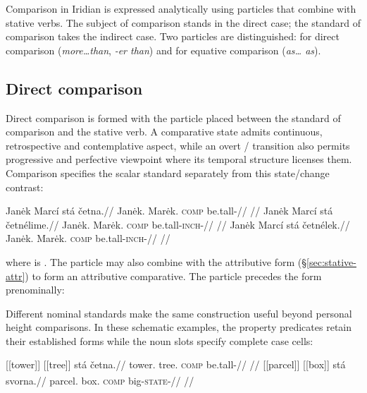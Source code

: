 Comparison in Iridian is expressed analytically using particles that combine
with stative verbs. The subject of comparison stands in the direct case; the
standard of comparison takes the indirect case. Two particles are
distinguished:  for direct comparison (\textit{more\ldots than},
\textit{-er than}) and  for equative comparison (\textit{as\ldots
as}).

\subsection{Direct comparison}

Direct comparison is formed with the particle  placed between the
standard of comparison and the stative verb. A comparative state admits
continuous, retrospective and contemplative aspect, while an overt
/ transition also permits progressive and perfective
viewpoint where its temporal structure licenses them. Comparison specifies
the scalar standard separately from this state/change contrast:

\pex
\a
\begingl
\gla Janėk Marcí stá četna.//
\glb Janėk.\Dir{} Marėk.\Ind{} \textsc{comp} be.tall-\Cont{}//
\glft {}//
\endgl
\a
\begingl
\gla Janėk Marcí stá četnélime.//
\glb Janėk.\Dir{} Marėk.\Ind{} \textsc{comp} be.tall-\textsc{inch}-\Prog{}//
\glft {}//
\endgl
\a
\begingl
\gla Janėk Marcí stá četnélek.//
\glb Janėk.\Dir{} Marėk.\Ind{} \textsc{comp} be.tall-\textsc{inch}-\Pf{}//
\glft {}//
\endgl
\xe

\noindent where  is . The particle  may also
combine with the  attributive form (§\ref{sec:stative-attr}) to form
an attributive comparative. The particle precedes the  form
prenominally:

\pex
\a {} 
\a {} 
\xe

Different nominal standards make the same construction useful beyond
personal height comparisons. In these schematic examples, the property
predicates retain their established forms while the noun slots specify
complete case cells:

\pex\label{ex:comparison-slot-dimensions}
\a
\begingl
\gla \textnormal{[[tower]]}\textsubscript{\Dir{}} \textnormal{[[tree]]}\textsubscript{\Ind{}} stá četna.//
\glb tower.\Dir{} tree.\Ind{} \textsc{comp} be.tall-\Cont{}//
\glft {}
//
\endgl
\a
\begingl
\gla \textnormal{[[parcel]]}\textsubscript{\Dir{}} \textnormal{[[box]]}\textsubscript{\Ind{}} stá svorna.//
\glb parcel.\Dir{} box.\Ind{} \textsc{comp} big-\textsc{state}-\Cont{}//
\glft {}
//
\endgl
\xe

